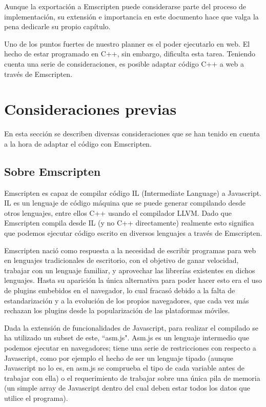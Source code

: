 Aunque la exportación a Emscripten puede considerarse parte del proceso de implementación, su extensión e importancia en este documento hace que valga la pena dedicarle su propio capítulo.

Uno de los puntos fuertes de nuestro planner es el poder ejecutarlo en web. El hecho de estar programado en C++, sin embargo, dificulta esta tarea. Teniendo cuenta una serie de consideraciones, es posible adaptar código C++ a web a través de Emscripten.

\label{emscripten}
\section{Consideraciones previas}
En esta sección se describen diversas consideraciones que se han tenido en cuenta a la hora de adaptar el código con Emscripten.


\subsection{Sobre Emscripten}
\label{about_emscripten}
Emscripten es capaz de compilar código IL (Intermediate Language) a Javascript. IL es un lenguaje de código máquina que se puede generar compilando desde otros lenguajes, entre ellos C++ usando el compilador LLVM. Dado que Emscripten compila desde IL (y no C++ directamente) realmente esto significa que podemos ejecutar código escrito en diversos lenguajes a través de Emscripten.

Emscripten nació como respuesta a la necesidad de escribir programas para web en lenguajes tradicionales de escritorio, con el objetivo de ganar velocidad, trabajar con un lenguaje familiar, y aprovechar las librerías existentes en dichos lenguajes. Hasta su aparición la única alternativa para poder hacer esto era el uso de plugins embebidos en el navegador, lo cual fracasó debido a la falta de estandarización y a la evolución de los propios navegadores, que cada vez más rechazan los plugins desde la popularización de las plataformas móviles.

Dada la extensión de funcionalidades de Javascript, para realizar el compilado se ha utilizado un subset de este, ``asm.js". Asm.js es un lenguaje intermedio que podemos ejecutar en navegadores; tiene una serie de restricciones con respecto a Javascript, como por ejemplo el hecho de ser un lenguaje tipado (aunque Javascript no lo es, en asm.js se comprueba el tipo de cada variable antes de trabajar con ella) o el requerimiento de trabajar sobre una única pila de memoria (un simple array de Javascript dentro del cual deben estar todos los datos que utilice el programa).

